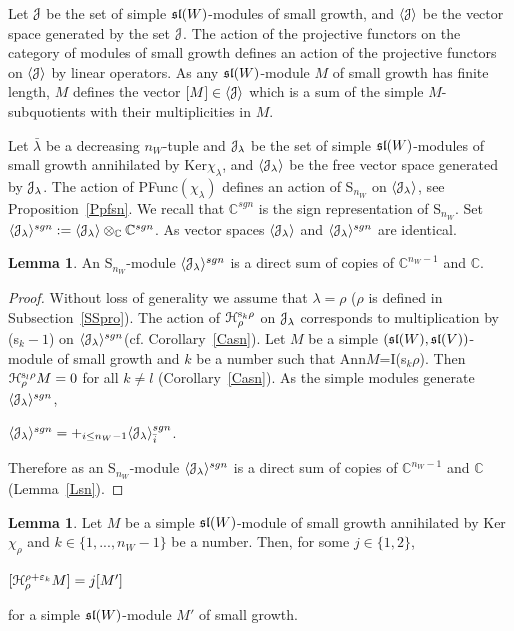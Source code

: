 \documentclass[12pt]{amsart}
\theoremstyle{definition}\newtheorem{theorem}{Theorem}[section]
\newtheorem{lemma}[proposition]{Lemma}
\theoremstyle{definition}\newtheorem{definition}[proposition]{Definition}
\theoremstyle{remark}\newtheorem{example}[proposition]{Example}
\begin{document}
Let $\EuScript J$ be the set of simple $\frak{sl}(W)$-modules of small growth, and $\langle\EuScript J\rangle$ be the vector space generated by the set $\EuScript J$. The action of the projective functors on the category of modules of small growth defines an action of the projective functors on $\langle\EuScript J\rangle$ by linear operators. As any $\frak{sl}(W)$-module $M$ of small growth has finite length, $M$ defines the vector $[M]\in\langle\EuScript J\rangle$ which is a sum of the simple $M$-subquotients with their multiplicities in $M$.

Let $\bar\lambda$ be a decreasing $n_W$-tuple and $\EuScript J_\lambda$ be the set of simple $\frak{sl}(W)$-modules of small growth annihilated by Ker$\chi_\lambda$, and $\langle\EuScript J_\lambda\rangle$ be the free vector space generated by $\EuScript J_\lambda$. The action of PFunc$(\chi_\lambda)$ defines an action of S$_{n_W}$ on $\langle\EuScript J_\lambda\rangle$, see Proposition~\ref{Ppfsn}. We recall that $\mathbb C^{sgn}$ is the sign representation of S$_{n_W}$. Set $\langle\EuScript J_\lambda\rangle^{sgn}:=\langle\EuScript J_\lambda\rangle\otimes_\mathbb C\mathbb C^{sgn}$. As vector spaces $\langle\EuScript J_\lambda\rangle$ and $\langle\EuScript J_\lambda\rangle^{sgn}$ are identical.
\begin{lemma}An S$_{n_W}$-module $\langle\EuScript J_\lambda\rangle^{sgn}$ is a direct sum of copies of $\mathbb C^{n_W-1}$ and $\mathbb C$.\end{lemma}
\begin{proof} Without loss of generality we assume that $\lambda=\rho$ ($\rho$ is defined in Subsection~\ref{SSpro}). The action of $\EuScript H_\rho^{\mathrm s_k\rho}$ on $\EuScript J_\lambda$ corresponds to multiplication by (s$_k-1$) on $\langle\EuScript J_\lambda\rangle^{sgn}$(cf. Corollary~\ref{Casn}). Let $M$ be a simple $(\frak{sl}(W), \frak{sl}(V))$-module of small growth and $k$ be a number such that Ann$M$=I(s$_k\rho$). Then $\EuScript H_\rho^{\mathrm s_l\rho}M=0$ for all $k\ne l$ (Corollary~\ref{Casn}). As the simple modules generate $\langle\EuScript J_\lambda\rangle^{sgn}$, \begin{center}$\langle\EuScript J_\lambda\rangle^{sgn}=+_{i\le n_W-1}\langle\EuScript J_\lambda\rangle^{sgn}_{\bar i}$.\end{center} Therefore as an S$_{n_W}$-module $\langle\EuScript J_\lambda\rangle^{sgn}$ is a direct sum of copies of $\mathbb C^{n_W-1}$ and $\mathbb C$ (Lemma~\ref{Lsn}).\end{proof}
\begin{lemma}Let $M$ be a simple $\frak{sl}(W)$-module of small growth annihilated by Ker$\chi_\rho$ and $k\in\{1,..., n_W-1\}$ be a number. Then, for some $j\in\{1, 2\}$, \begin{center}$[\EuScript H_\rho^{\rho+\varepsilon_k}M]=j[M']$\end{center}for a simple $\frak{sl}(W)$-module $M'$ of small growth.\end{lemma}
\end{document}

